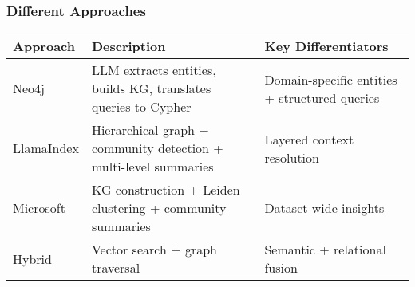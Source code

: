 \begin{frame}[fragile]\frametitle{Different Approaches}

	\begin{table}[h!]
		\centering
			\begin{tabular}{|l|p{4cm}|p{3.5cm}|}	\hline

			\textbf{Approach} & \textbf{Description} & \textbf{Key Differentiators} \\
			\hline
			Neo4j & LLM extracts entities, builds KG, translates queries to Cypher & Domain-specific entities + structured queries \\
			\hline
			LlamaIndex & Hierarchical graph + community detection + multi-level summaries & Layered context resolution \\
			\hline
			Microsoft & KG construction + Leiden clustering + community summaries & Dataset-wide insights \\
			\hline
			Hybrid & Vector search + graph traversal & Semantic + relational fusion \\
			\hline
			\end{tabular}
	\end{table}

\end{frame}